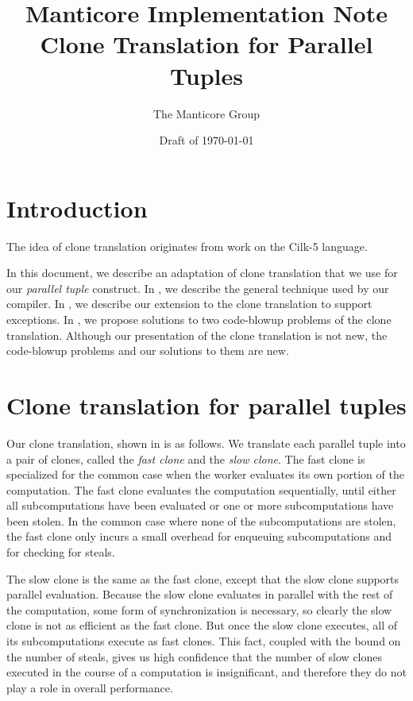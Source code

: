 \documentclass[11pt]{article}
\title{Manticore Implementation Note \\ Clone Translation for Parallel Tuples}
\author{The Manticore Group}
\date{Draft of \today}
\begin{document}
\maketitle

\section{Introduction}
The idea of clone translation originates from work on the Cilk-5 language.

In this document, we describe an adaptation of clone translation that we use for
our \emph{parallel tuple} construct.
In , we describe the general technique used by 
our compiler.
In , we describe our extension to the clone translation
to support exceptions.
In , we propose solutions to two code-blowup 
problems of the clone translation.
Although our presentation of the clone translation is not new, the code-blowup
problems and our solutions to them are new.

\section{Clone translation for parallel tuples}
\label{sec:clone-translation}

Our clone translation, shown in  is as follows.  We translate each parallel
tuple into a pair of clones, called the \emph{fast clone} and the
\emph{slow clone}.  The fast clone is specialized for the common case when
the worker evaluates its own portion of the computation.  The fast
clone evaluates the computation sequentially, until either all
subcomputations have been evaluated or one or more subcomputations
have been stolen.  In the common case where none of the
subcomputations are stolen, the fast clone only incurs a small
overhead for enqueuing subcomputations and for checking for steals.

The slow clone is the same as the fast clone, except that the slow
clone supports parallel evaluation.  Because the slow clone evaluates
in parallel with the rest of the computation, some form of synchronization
is necessary, so clearly the slow clone is not as efficient as the fast 
clone.  But once the slow clone executes, all of its subcomputations execute 
as fast clones. This fact, coupled with the bound on the number of steals, 
gives us high confidence that the number of slow clones executed in the course of
a computation is insignificant, and therefore they do not play a
role in overall performance.
\end{document}
